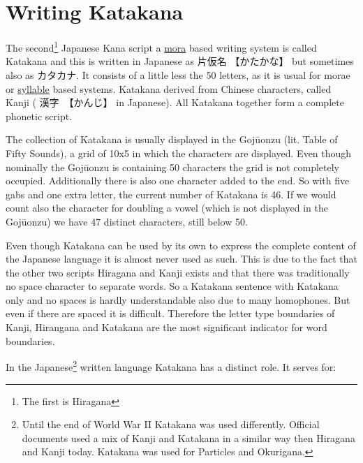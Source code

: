 \chapter{Writing Katakana}\label{chap:WritingKatakana}

The second\footnote{The first is Hiragana} Japanese Kana script a
\hyperref[sec:Mora]{mora}  based writing system is called Katakana and this is
written in Japanese as {片仮名} {【かたかな】} but sometimes also as
{カタカナ}.  It consists of a little less the 50 letters, as it is usual for
morae or \hyperref[sec:Syllable]{syllable} based systems. Katakana derived from
Chinese characters, called Kanji ( {漢字}　{【かんじ】} in Japanese). All
Katakana together form a complete phonetic script.

The collection of Katakana is usually displayed in the Gojūonzu (lit. Table of
Fifty Sounds), a grid of 10x5 in which the characters are displayed. Even
though nominally the Gojūonzu is containing 50 characters the grid is not
completely occupied. Additionally there is also one character added to the
end. So with five gabs and one extra letter, the current number of Katakana is
46. If we would count also the character for doubling a vowel (which is not
displayed in the Gojūonzu) we have 47 distinct characters, still below 50. 



Even though Katakana can be used by its own to express the complete content of
the Japanese language it is almost never used as such. This is due to the fact
that the other two scripts Hiragana and Kanji exists and that there was
traditionally no space character to separate words. So a Katakana sentence with
Katakana only and no spaces is hardly understandable also due to many
homophones.  But even if there are spaced it is difficult. Therefore the letter
type boundaries of Kanji, Hirangana and Katakana are the most significant
indicator for word boundaries.

In the Japanese\footnote{Until the end of World War II Katakana was used
differently. Official documents used a mix of Kanji and Katakana in a similar
way then Hiragana and Kanji today. Katakana was used for Particles and
Okurigana.} written language Katakana has a distinct role. It serves for:

